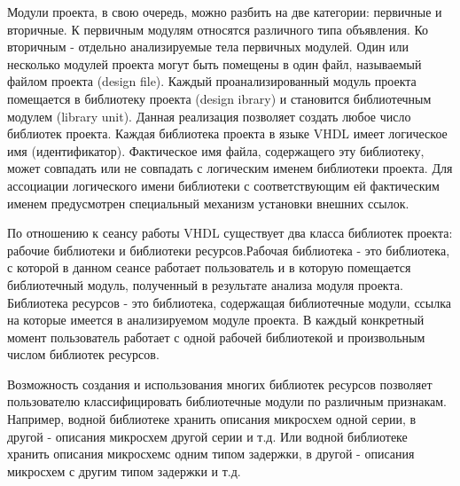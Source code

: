 Модули проекта, в свою очередь, можно разбить на две категории: первичные и вторичные. К первичным модулям относятся различного типа объявления. Ко вторичным  -  отдельно анализируемые тела первичных модулей. Один или несколько модулей проекта могут быть помещены в один файл, называемый файлом проекта (design file). Каждый проанализированный модуль проекта помещается в библиотеку проекта (design ibrary) и становится библиотечным модулем (library unit). Данная реализация позволяет создать любое число библиотек проекта. Каждая библиотека проекта в языке  VHDL имеет логическое имя (идентификатор). Фактическое имя файла, содержащего эту библиотеку, может совпадать или не совпадать с логическим именем библиотеки проекта. Для ассоциации логического имени библиотеки с соответствующим ей фактическим именем предусмотрен специальный механизм установки внешних ссылок.

По отношению к сеансу работы  VHDL существует два класса библиотек проекта: рабочие библиотеки и библиотеки ресурсов.Рабочая библиотека  -  это библиотека, с которой в данном сеансе работает пользователь и в которую помещается библиотечный модуль, полученный в результате анализа модуля проекта. Библиотека ресурсов  -  это библиотека, содержащая библиотечные модули, ссылка на которые имеется в анализируемом модуле проекта. В каждый конкретный момент пользователь работает с одной рабочей библиотекой и произвольным числом библиотек ресурсов.

Возможность создания и использования многих библиотек ресурсов позволяет пользователю классифицировать библиотечные модули по различным признакам. Например, водной библиотеке хранить описания микросхем одной серии, в другой  -  описания микросхем другой серии и т.д.    Или водной библиотеке хранить описания микросхемс одним типом задержки,  в другой  -  описания микросхем с другим типом задержки и т.д.

